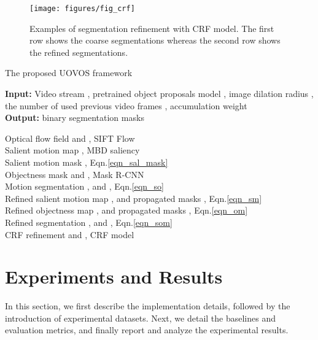 \documentclass[journal]{IEEEtran}
\makeatletter
\newcommand{\eqn}{{Eqn.}\@\xspace}
\makeatother
\begin{document}
\begin{figure}[!t]
	\centerline{\texttt{[image: figures/fig\_crf]}}
	\caption{Examples of segmentation refinement with CRF model. The first row shows the coarse segmentations whereas the second row shows the refined segmentations.}
	\label{fig_crf}
\end{figure} \begin{algorithm}[!t]
	\small
	\caption{\small The proposed UOVOS framework}
	\label{alg_vos}
	\begin{flushleft}
		\textbf{Input:} Video stream {\small }, pretrained object proposals model ,
		image dilation radius , the number of used previous video frames , accumulation weight  \\
		\textbf{Output:} binary segmentation masks 
	\end{flushleft}
	
	\SetAlgoLined
	 {
		Optical flow field    and , SIFT Flow \cite{TPAMI2011_Liu}    \\
		Salient motion map   , MBD saliency \cite{ICCV2015_Zhang}   \\
		Salient motion mask   , \eqn \ref{eqn_sal_mask}     \\
		Objectness mask    and , Mask R-CNN \cite{ICCV2017_He} \\
		Motion segmentation   ,  and , \eqn \ref{eqn_so}    \\
		\If{} {
			Refined salient motion map   ,  and 
			propagated masks , \eqn \ref{eqn_sm} \\ 	
			
			Refined objectness map   ,  and 
			propagated masks , \eqn \ref{eqn_om} \\ 	
			
			Refined segmentation   ,  and , \eqn \ref{eqn_som}    \\
			
			CRF refinement    and , CRF model \cite{NIPS2011_Krahenbuhl}  \\		
		}
	}
\end{algorithm}  \section{Experiments and Results}
\label{sec:experiment}
In this section, we first describe the implementation details, followed by the introduction of experimental datasets. Next, we detail the baselines and evaluation metrics, and finally report and analyze the experimental results. 
\end{document}
